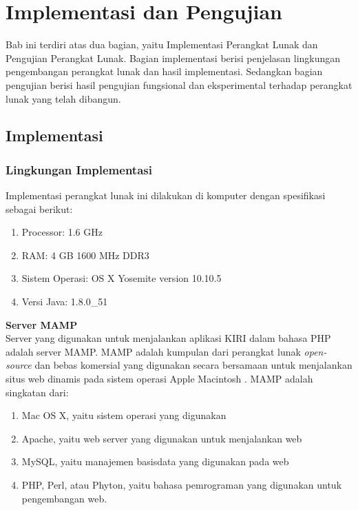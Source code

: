\chapter{Implementasi dan Pengujian}
\label{chap:implementasiPengujian}

Bab ini terdiri atas dua bagian, yaitu Implementasi Perangkat Lunak dan Pengujian Perangkat Lunak. Bagian implementasi berisi penjelasan lingkungan pengembangan perangkat lunak dan hasil implementasi. Sedangkan bagian pengujian berisi hasil pengujian fungsional dan eksperimental terhadap perangkat lunak yang telah dibangun.

\section{Implementasi}
\label{sec:implementasi}

\subsection{Lingkungan Implementasi}
\label{sec:lingkungan_implementasi}
Implementasi perangkat lunak ini dilakukan di komputer dengan spesifikasi sebagai berikut:
\begin{enumerate}
	\item Processor: 1.6 GHz
	\item RAM: 4 GB 1600 MHz DDR3
	\item Sistem Operasi: OS X Yosemite version 10.10.5
	\item Versi Java: 1.8.0\_51
\end{enumerate}

\textbf{Server MAMP}\\
Server yang digunakan untuk menjalankan aplikasi KIRI dalam bahasa PHP adalah server MAMP. MAMP adalah kumpulan dari perangkat lunak \textit{open-source} dan bebas komersial yang digunakan secara bersamaan untuk menjalankan situs web dinamis pada sistem operasi Apple Macintosh \cite{mamp}. MAMP adalah singkatan dari:
\begin{enumerate}
	\item Mac OS X, yaitu sistem operasi yang digunakan
	\item Apache, yaitu web server yang digunakan untuk menjalankan web
	\item MySQL, yaitu manajemen basisdata yang digunakan pada web
	\item PHP, Perl, atau Phyton, yaitu bahasa pemrograman yang digunakan untuk pengembangan web.
\end{enumerate}

